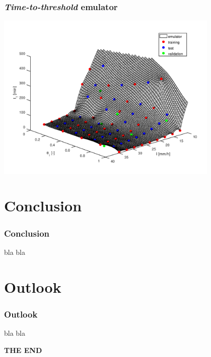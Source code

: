 \documentclass[xcolor=dvipsnames, USenglish]{beamer}  %
\begin{document}
  \begin{frame}
    \frametitle{\emph{Time-to-threshold} emulator}
    \centering
    \includegraphics[width=0.8\textwidth]{img/emulator.png}
  \end{frame}


\section{Conclusion}

  \begin{frame}
    \frametitle{Conclusion}
    bla bla
  \end{frame}


\section{Outlook}

  \begin{frame}
    \frametitle{Outlook}
    bla bla
  \end{frame}


  {
  \begin{frame}[plain]
    \centering
    \Large{\textbf{THE END}}\\
  \end{frame}
  }
\end{document}
